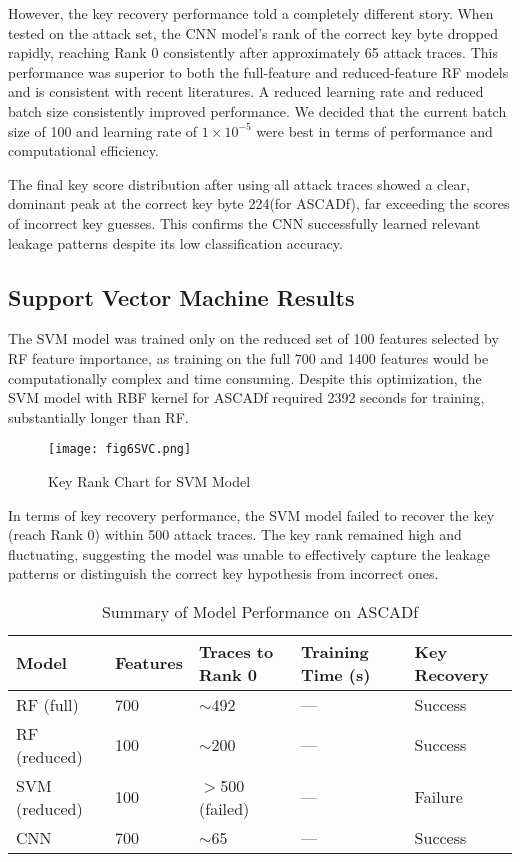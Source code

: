 \documentclass[runningheads]{llncs}
\begin{document}
However, the key recovery performance told a completely different story. When tested on the attack set, the CNN model's rank of the correct key byte dropped rapidly, reaching Rank 0 consistently after approximately 65 attack traces. This performance was superior to both the full-feature and reduced-feature RF models and is consistent with recent literatures. A reduced learning rate and reduced batch size consistently improved performance. We decided that the current batch size of 100 and learning rate of $1 \times 10^{-5}$ were best in terms of performance and computational efficiency. 

The final key score distribution after using all attack traces showed a clear, dominant peak at the correct key byte 224(for ASCADf), far exceeding the scores of incorrect key guesses. This confirms the CNN successfully learned relevant leakage patterns despite its low classification accuracy.

\subsection{Support Vector Machine Results}
The SVM model was trained only on the reduced set of 100 features selected by RF feature importance, as training on the full 700 and 1400 features would be computationally complex and time consuming. Despite this optimization, the SVM model with RBF kernel for ASCADf required 2392 seconds for training, substantially longer than RF. 

\begin{figure}[htbp]
    \centering
    \texttt{[image: fig6SVC.png]}
    \caption{Key Rank Chart for SVM Model}
    \label{fig:svc_key_rank}
\end{figure}

In terms of key recovery performance, the SVM model failed to recover the key (reach Rank 0) within 500 attack traces. The key rank remained high and fluctuating, suggesting the model was unable to effectively capture the leakage patterns or distinguish the correct key hypothesis from incorrect ones.
\begin{table}[htbp]
    \centering
    \caption{Summary of Model Performance on ASCADf }
    \label{tab:model_comparison}
    \begin{tabular}{|p{2.5cm}|p{1.6cm}|p{2.2cm}|p{2cm}|p{2.6cm}|}
        \hline
        \textbf{Model} & \textbf{Features} & \textbf{Traces to Rank 0} & \textbf{Training Time (s)} & \textbf{Key Recovery} \\
        \hline
        RF (full) & 700 & $\sim$492 & --- & Success \\
        \hline
        RF (reduced) & 100 & $\sim$200 & ---  & Success \\
        \hline
        SVM (reduced) & 100 & $>$500 (failed) & --- & Failure \\
        \hline
        CNN & 700 & $\sim$65 & ---  & Success \\
        \hline
    \end{tabular}
\end{table}
\end{document}
